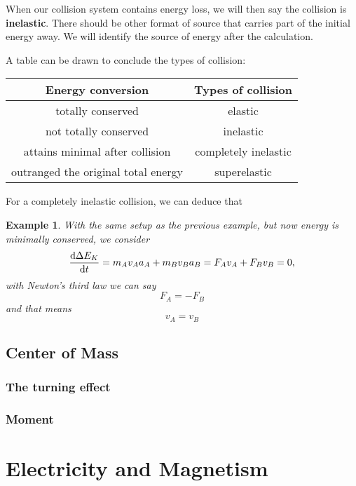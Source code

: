 \documentclass[12pt]{article}
\newtheorem*{example}{Example}
\begin{document}
    When our collision system contains energy loss, we will then say the collision is \textbf{inelastic}. There should be other format of source that carries part of the initial energy away. We will identify the source of energy after the calculation.

    A table can be drawn to conclude the types of collision:

    \begin{center}
        \begin{tabular}{|c|c|}
            \hline
            Energy conversion&Types of collision\\
            \hline
            totally conserved&elastic\\
            \hline
            not totally conserved&inelastic\\
            \hline
            attains minimal after collision&completely inelastic\\
            \hline
            outranged the original total energy&superelastic\\
            \hline
        \end{tabular}
    \end{center}

    For a completely inelastic collision, we can deduce that

    \begin{example}
        With the same setup as the previous example, but now energy is minimally conserved, we consider \[\derivative{\Delta E_K}{t}=m_A v_A a_A+m_B v_B a_B = F_A v_A + F_B v_B = 0,\] with Newton's third law we can say \[F_A = -F_B\] and that means \[v_A = v_B\]
    \end{example}

    \subsection{Center of Mass}

    \subsubsection*{The turning effect}

    \subsubsection*{Moment}

    \newpage
    \section{Electricity and Magnetism}
\end{document}
